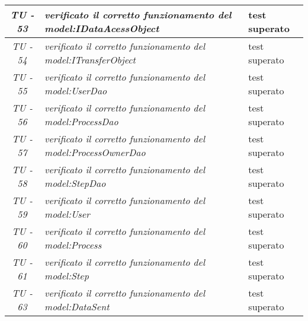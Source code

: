 \begin{small}\centering
\begin{tabular}{|c|p{8.0cm}|p{2.0cm}|}
\textit{TU - 53} &
\textit{verificato il corretto funzionamento del model:IDataAcessObject} & test superato \\
\hline

\textit{TU - 54} &
\textit{verificato il corretto funzionamento del model:ITransferObject} & test superato \\
\hline

\textit{TU - 55} &
\textit{verificato il corretto funzionamento del model:UserDao} & test superato \\
\hline

\textit{TU - 56} &
\textit{verificato il corretto funzionamento del model:ProcessDao} & test superato \\
\hline

\textit{TU - 57} &
\textit{verificato il corretto funzionamento del model:ProcessOwnerDao} & test superato \\
\hline

\textit{TU - 58} &
\textit{verificato il corretto funzionamento del model:StepDao} & test superato \\
\hline

\textit{TU - 59} &
\textit{verificato il corretto funzionamento del model:User} & test superato \\
\hline

\textit{TU - 60} &
\textit{verificato il corretto funzionamento del model:Process} & test superato \\
\hline

\textit{TU - 61} &
\textit{verificato il corretto funzionamento del model:Step} & test superato \\
\hline

\textit{TU - 63} &
\textit{verificato il corretto funzionamento del model:DataSent} & test superato \\
\hline
\end{tabular}\\
\end{small}

